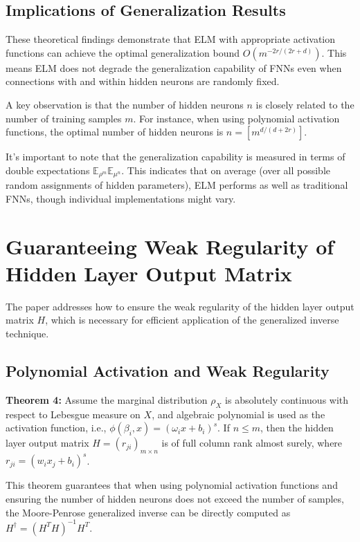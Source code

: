 \documentclass[11pt]{article}
\begin{document}
\subsection{Implications of Generalization Results}

These theoretical findings demonstrate that ELM with appropriate activation functions can achieve the optimal generalization bound $O(m^{-2r/(2r+d)})$. This means ELM does not degrade the generalization capability of FNNs even when connections with and within hidden neurons are randomly fixed.

A key observation is that the number of hidden neurons $n$ is closely related to the number of training samples $m$. For instance, when using polynomial activation functions, the optimal number of hidden neurons is $n = [m^{d/(d+2r)}]$.

It's important to note that the generalization capability is measured in terms of double expectations $\mathbb{E}_{\rho^m}\mathbb{E}_{\mu^n}$. This indicates that on average (over all possible random assignments of hidden parameters), ELM performs as well as traditional FNNs, though individual implementations might vary.

\section{Guaranteeing Weak Regularity of Hidden Layer Output Matrix}

The paper addresses how to ensure the weak regularity of the hidden layer output matrix $H$, which is necessary for efficient application of the generalized inverse technique.

\subsection{Polynomial Activation and Weak Regularity}

\textbf{Theorem 4:} Assume the marginal distribution $\rho_X$ is absolutely continuous with respect to Lebesgue measure on $X$, and algebraic polynomial is used as the activation function, i.e., $\phi(\beta_i, x) = (\omega_i x + b_i)^s$. If $n \leq m$, then the hidden layer output matrix $H = (r_{ji})_{m \times n}$ is of full column rank almost surely, where $r_{ji} = (w_i x_j + b_i)^s$.

This theorem guarantees that when using polynomial activation functions and ensuring the number of hidden neurons does not exceed the number of samples, the Moore-Penrose generalized inverse can be directly computed as $H^\dagger = (H^T H)^{-1} H^T$.
\end{document}
